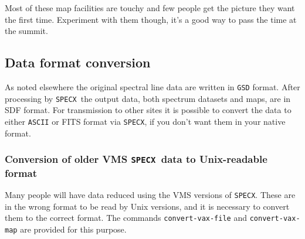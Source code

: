 \documentclass[11pt,twoside]{starlink}
\providecommand{\SPECX}{\texttt{SPECX}}
\begin{document}
Most of these map facilities are touchy and few people get the picture
they want the first time.  Experiment with them though, it's a good
way to pass the time at the summit.

\subsection{Data format conversion}
\label{sec:fits-etc}
As noted elsewhere the original spectral line data are written in \texttt{GSD} format. After processing by \SPECX\ the output data, both
spectrum datasets and maps, are in SDF format. For transmission to
other sites it is possible to convert the data to either \texttt{ASCII}
or FITS format via
\SPECX , if you don't want them in your native format.

\subsubsection{Conversion of older VMS \SPECX\ data to Unix-readable
format}
\label{sec:cvf_cvm}
Many people will have data reduced using the VMS versions of
\SPECX . These are in the wrong format to be read by Unix versions,
and it is necessary to convert them to the correct format. The
commands \texttt{convert-vax-file} and \texttt{convert-vax-map} are provided
for this purpose.
\end{document}
